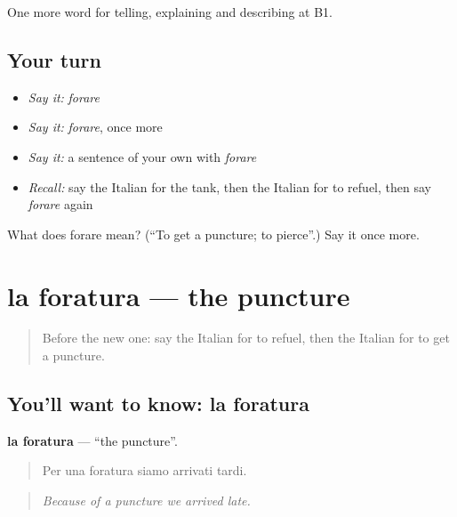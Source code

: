 \begin{grammarlens}[title={What you've built}]
One more word for telling, explaining and describing at B1.
\end{grammarlens}

\subsection*{Your turn}
\begin{itemize}
\raggedright
  \item \emph{Say it:} \emph{forare}
  \item \emph{Say it:} \emph{forare}, once more
  \item \emph{Say it:} a sentence of your own with \emph{forare}
  \item \emph{Recall:} say the Italian for the tank, then the Italian for to refuel, then say \emph{forare} again
\end{itemize}

\begin{tcolorbox}[breakable,colback=teal!4,colframe=teal!35!black,title={Before you move on}]
What does forare mean? (\textquotedblleft{}To get a puncture; to pierce\textquotedblright{}.) Say it once more.
\end{tcolorbox}
\section[la foratura]{la foratura — the puncture}

\label{lesson:IT-C409-foratura}



\begin{quote}
Before the new one: say the Italian for to refuel, then the Italian for to get a puncture.
\end{quote}

\subsection*{You'll want to know: la foratura}
\textbf{la foratura} — \textquotedblleft{}the puncture\textquotedblright{}.

\begin{quote}
Per una foratura siamo arrivati tardi.
\end{quote}

\begin{quote}
\emph{Because of a puncture we arrived late.}
\end{quote}


